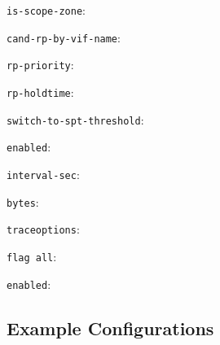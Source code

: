 \begin{description}
\begin{description}
\begin{description}
\item{\tt is-scope-zone}:
\item{\tt cand-rp-by-vif-name}:
\item{\tt rp-priority}:
\item{\tt rp-holdtime}:
\end{description}
\end{description}
\item{\tt switch-to-spt-threshold}:
\begin{description}
\item{\tt enabled}:
\item{\tt interval-sec}:
\item{\tt bytes}:
\end{description}
\item{\tt traceoptions}:
\begin{description}
\item{\tt flag all}:
\begin{description}
\item{\tt enabled}:
\end{description}
\end{description}
\end{description}
\subsection{Example Configurations}

